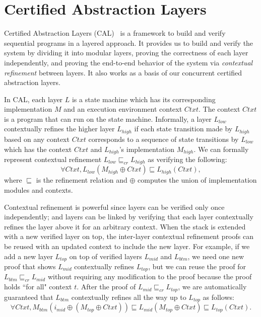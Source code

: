 \section{Certified Abstraction Layers}
\label{chapter:ccal:sec:cal}

Certified Abstraction Layers (CAL)~\cite{deepspec} is a framework to build and verify sequential programs in a layered approach. 
It provides us to build and verify the system by dividing it into modular layers, proving the correctness of each layer independently, 
and proving the end-to-end behavior of the system via \textit{contextual refinement} between layers.
It also works as a basis of our concurrent certified abstraction layers.

In CAL, each layer $L$ is a state machine which has its corresponding implementation $M$ and an execution environment context $Ctxt$. 
The context $Ctxt$ is a program that can run on the state machine. 
Informally, a layer $L_{low}$ contextually refines the higher layer $L_{high}$ if each state transition made by $L_{high}$ based on any context $Ctxt$ corresponds to a sequence of state transitions by $L_{low}$ which has the context $Ctxt$ and $L_{high}$'s implementation $M_{high}$. We can formally represent contextual refinement $L_{low} \sqsubseteq_{cr} L_{high}$ as verifying the following: 
$$\forall Ctxt, L_{low} (M_{high} \oplus Ctxt) \sqsubseteq L_{high} (Ctxt),$$
where $\sqsubseteq$ is the refinement relation and $\oplus$ computes the union of implementation modules and contexts.

Contextual refinement is powerful since layers can be verified only once independently; and layers can be linked by verifying that each layer contextually refines the layer above it for an arbitrary context.
 When the stack is extended with a new verified layer on top, the inter-layer contextual refinement proofs can be reused with an updated context to include the new layer. For example, if we add a new layer $L_{top}$ on top of verified layers $L_{mid}$ and $L_{btm}$, we need one new proof that shows $L_{mid}$ contextually refines $L_{top}$, but we can reuse the proof for $L_{btm} \sqsubseteq_{cr} L_{mid}$ without requiring any modification to the proof because the proof holds ``for all" context $t$. After the proof of $L_{mid} \sqsubseteq_{cr} L_{top}$, we are automatically guaranteed that $L_{btm}$ contextually refines all the way up to $L_{top}$ as follows:
$$
\forall Ctxt, M_{btm} (i_{mid}\oplus (M_{top} \oplus Ctxt)) \sqsubseteq L_{mid} (M_{top} \oplus Ctxt) \sqsubseteq L_{top} (Ctxt). 
$$

